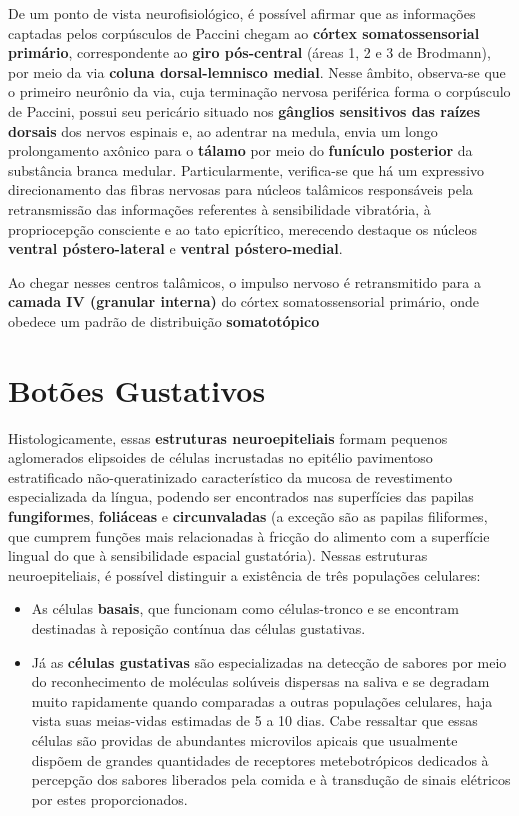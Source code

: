\documentclass[
]{book}
\theoremstyle{definition}
\theoremstyle{definition}
\theoremstyle{definition}
\theoremstyle{definition}
\theoremstyle{remark}
\begin{document}
De um ponto de vista neurofisiológico, é possível afirmar que as informações captadas pelos corpúsculos de Paccini chegam ao \textbf{córtex somatossensorial primário}, correspondente ao \textbf{giro pós-central} (áreas 1, 2 e 3 de Brodmann), por meio da via \textbf{coluna dorsal-lemnisco medial}. Nesse âmbito, observa-se que o primeiro neurônio da via, cuja terminação nervosa periférica forma o corpúsculo de Paccini, possui seu pericário situado nos \textbf{gânglios sensitivos das raízes dorsais} dos nervos espinais e, ao adentrar na medula, envia um longo prolongamento axônico para o \textbf{tálamo} por meio do \textbf{funículo posterior} da substância branca medular. Particularmente, verifica-se que há um expressivo direcionamento das fibras nervosas para núcleos talâmicos responsáveis pela retransmissão das informações referentes à sensibilidade vibratória, à propriocepção consciente e ao tato epicrítico, merecendo destaque os núcleos \textbf{ventral póstero-lateral} e \textbf{ventral póstero-medial}.

Ao chegar nesses centros talâmicos, o impulso nervoso é retransmitido para a \textbf{camada IV (granular interna)} do córtex somatossensorial primário, onde obedece um padrão de distribuição \textbf{somatotópico}

\hypertarget{botuxf5es-gustativos}{%
\chapter{Botões Gustativos}\label{botuxf5es-gustativos}}

Histologicamente, essas \textbf{estruturas neuroepiteliais} formam pequenos aglomerados elipsoides de células incrustadas no epitélio pavimentoso estratificado não-queratinizado característico da mucosa de revestimento especializada da língua, podendo ser encontrados nas superfícies das papilas \textbf{fungiformes}, \textbf{foliáceas} e \textbf{circunvaladas} (a exceção são as papilas filiformes, que cumprem funções mais relacionadas à fricção do alimento com a superfície lingual do que à sensibilidade espacial gustatória). Nessas estruturas neuroepiteliais, é possível distinguir a existência de três populações celulares:

\begin{itemize}
\item
  As células \textbf{basais}, que funcionam como células-tronco e se encontram destinadas à reposição contínua das células gustativas.
\item
  Já as \textbf{células gustativas} são especializadas na detecção de sabores por meio do reconhecimento de moléculas solúveis dispersas na saliva e se degradam muito rapidamente quando comparadas a outras populações celulares, haja vista suas meias-vidas estimadas de 5 a 10 dias. Cabe ressaltar que essas células são providas de abundantes microvilos apicais que usualmente dispõem de grandes quantidades de receptores metebotrópicos dedicados à percepção dos sabores liberados pela comida e à transdução de sinais elétricos por estes proporcionados.
\end{itemize}
\end{document}
